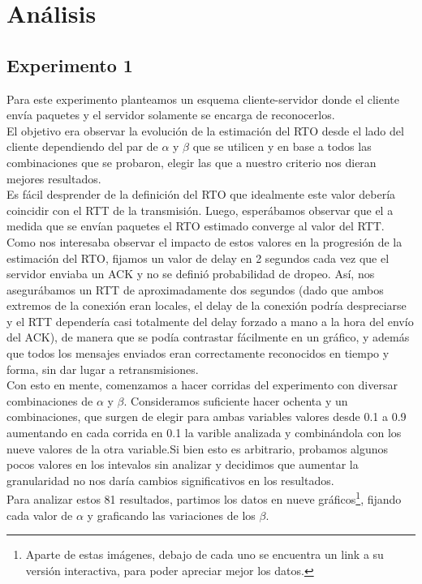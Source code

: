 \section{Análisis}

\subsection{Experimento 1}

\indent \indent Para este experimento planteamos un esquema cliente-servidor donde el cliente envía paquetes y el servidor solamente se encarga de reconocerlos.\\
\indent El objetivo era observar la evolución de la estimación del RTO desde el lado del cliente dependiendo del par de $\alpha$ y $\beta$ que se utilicen y en base a todos las combinaciones que se probaron, elegir las que a nuestro criterio nos dieran mejores resultados.\\
\indent Es fácil desprender de la definición del RTO que idealmente este valor debería coincidir con el RTT de la transmisión. Luego, esperábamos observar que el a medida que se envían paquetes el RTO estimado converge al valor del RTT.\\ 
\indent Como nos interesaba observar el impacto de estos valores en la progresión de la estimación del RTO, fijamos un valor de delay en 2 segundos cada vez que el servidor enviaba un ACK y no se definió probabilidad de dropeo. Así, nos asegurábamos un RTT de aproximadamente dos segundos (dado que ambos extremos de la conexión eran locales, el delay de la conexión podría despreciarse y el RTT dependería casi totalmente del delay forzado a mano a la hora del envío del ACK), de manera que se podía contrastar fácilmente en un gráfico, y además que todos los mensajes enviados eran correctamente reconocidos en tiempo y forma, sin dar lugar a retransmisiones.\\
\indent Con esto en mente, comenzamos a hacer corridas del experimento con diversar combinaciones de $\alpha$ y $\beta$. Consideramos suficiente hacer ochenta y un combinaciones, que surgen de elegir para ambas variables valores desde 0.1 a 0.9 aumentando en cada corrida en 0.1 la varible analizada y combinándola con los nueve valores de la otra variable.Si bien esto es arbitrario, probamos algunos pocos valores en los intevalos sin analizar y decidimos que aumentar la granularidad no nos daría cambios significativos en los resultados.\\
\indent Para analizar estos 81 resultados, partimos los datos en nueve gráficos\footnote{Aparte de estas imágenes, debajo de cada uno se encuentra un link a su versión interactiva, para poder apreciar mejor los datos.}, fijando cada valor de $\alpha$ y graficando las variaciones de los $\beta$.\\
